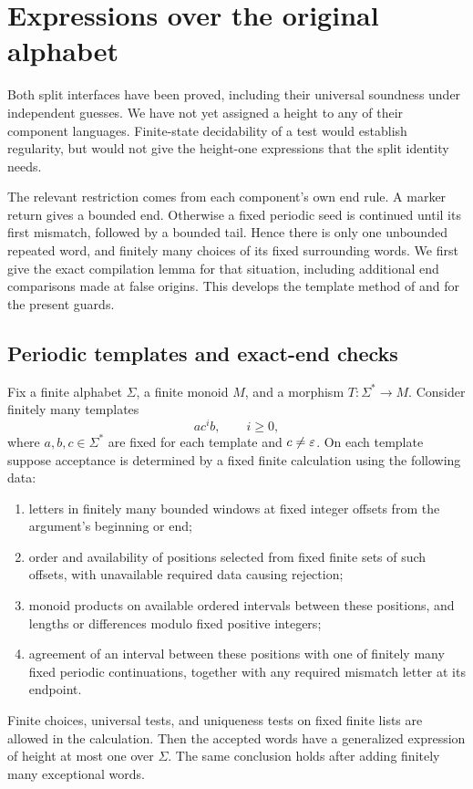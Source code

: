 \section{Expressions over the original alphabet}
\label{sec:compilation}

Both split interfaces have been proved, including their universal
soundness under independent guesses. We have not yet assigned a height
to any of their component languages. Finite-state decidability of a test
would establish regularity, but would not give the height-one expressions
that the split identity needs.

The relevant restriction comes from each component's own end rule. A
marker return gives a bounded end. Otherwise a fixed periodic seed is
continued until its first mismatch, followed by a bounded tail. Hence
there is only one unbounded repeated word, and finitely many choices of
its fixed surrounding words. We first give the exact compilation lemma
for that situation, including additional end comparisons made at false
origins. This develops the template method of
\cite[Lemma~8.1 and Proposition~8.2]{HeightThirteen} and
\cite[Lemma~7.1 and Proposition~7.2]{HeightFour} for the present guards.

\subsection{Periodic templates and exact-end checks}

\begin{lemma}\label{compile:templates}
Fix a finite alphabet $\Sigma$, a finite monoid $M$, and a morphism
$T:\Sigma^*\to M$. Consider finitely many templates
\begin{equation}\label{compile:eq-template}
                     a c^i b,\qquad i\ge0,
\end{equation}
where $a,b,c\in\Sigma^*$ are fixed for each template and $c\ne\varepsilon$.
On each template suppose acceptance is determined by a fixed finite
calculation using the following data:
\begin{enumerate}
\item letters in finitely many bounded windows at fixed integer offsets
from the argument's beginning or end;
\item order and availability of positions selected from fixed finite sets
of such offsets, with unavailable required data causing rejection;
\item monoid products on available ordered intervals between these positions,
and lengths or differences modulo fixed positive integers;
\item agreement of an interval between these positions with one of finitely
many fixed periodic continuations, together with any required mismatch
letter at its endpoint.
\end{enumerate}
Finite choices, universal tests, and uniqueness tests on fixed finite lists
are allowed in the calculation. Then the accepted words have a generalized
expression of height at most one over $\Sigma$. The same conclusion holds
after adding finitely many exceptional words.
\end{lemma}


